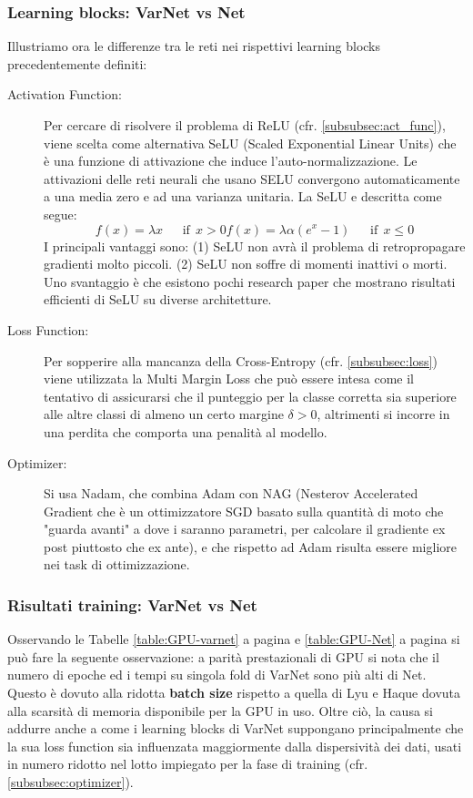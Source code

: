 \subsubsection{Learning blocks: VarNet vs Net}
Illustriamo ora le differenze tra le reti nei rispettivi learning blocks precedentemente definiti:
\begin{description}
 \item[Activation Function:] Per cercare di risolvere il problema di ReLU (cfr. \ref{subsubsec:act_func}), viene scelta
    come alternativa SeLU (Scaled Exponential Linear Units) che è una funzione di attivazione che induce 
    l'auto-normalizzazione. Le attivazioni delle reti neurali che usano SELU convergono automaticamente a una media 
    zero e ad una varianza unitaria. La SeLU e descritta come segue:
 \begin{equation}
    f(x) = \lambda x \ \ \ \ \ \ \ \text{if} \ \ x > 0 
    f(x)= \lambda \alpha (e^x - 1) \ \ \ \ \ \ \ \text{if} \ \ x \leq 0 
\end{equation}
I principali vantaggi sono: (1) SeLU non avrà il problema di retropropagare gradienti molto piccoli. (2) SeLU non soffre
di momenti inattivi o morti. 
Uno svantaggio è che esistono pochi research paper che mostrano risultati efficienti di SeLU su diverse architetture.

 \item[Loss Function:] Per sopperire alla mancanza della Cross-Entropy (cfr. \ref{subsubsec:loss}) viene utilizzata la
    Multi Margin Loss che può essere intesa come il tentativo di assicurarsi che il punteggio per la classe corretta sia
    superiore alle altre classi di almeno un certo margine $\delta > 0$, altrimenti si incorre in una perdita che
    comporta una penalità al modello.
 
 \item[Optimizer:] Si usa Nadam, che combina Adam con NAG (Nesterov Accelerated Gradient che è un ottimizzatore SGD
    basato sulla quantità di moto che "guarda avanti" a dove i saranno parametri, per calcolare il gradiente ex post
    piuttosto che ex ante), e che rispetto ad Adam risulta essere migliore nei task di ottimizzazione. 
\end{description}

\subsubsection{Risultati training: VarNet vs Net}
Osservando le Tabelle \ref{table:GPU-varnet} a pagina \pageref{table:GPU-varnet} e \ref{table:GPU-Net} a 
pagina \pageref{table:GPU-Net} si può fare la seguente osservazione: a parità
prestazionali di GPU si nota che il numero di epoche ed i tempi su singola fold di VarNet sono più alti di Net. 
Questo è dovuto alla ridotta \textbf{batch size} rispetto a quella di Lyu e Haque \cite{lyu2018deep} dovuta alla
scarsità di memoria disponibile per la GPU in uso. Oltre ciò, la causa si addurre anche a come i learning blocks di
VarNet suppongano principalmente che la sua loss function sia influenzata maggiormente dalla dispersività dei dati,
usati in numero ridotto nel lotto impiegato per la fase di training (cfr. \ref{subsubsec:optimizer}). 

